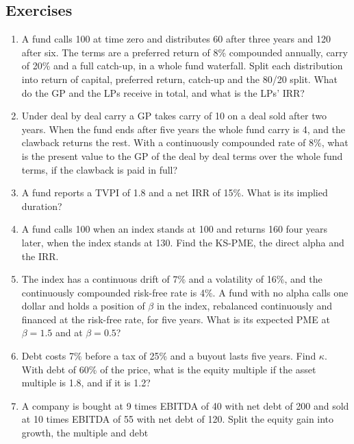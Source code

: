 \begin{chapterrefs}
\FloatBarrier
\section{Exercises}
\label{sec11:exercises}

\begin{enumerate}[label=\textbf{11.\arabic*}, ref=11.\arabic*, leftmargin=*]
  \item\label{exr11:one} A fund calls 100 at time zero and distributes 60 after three years and 120 after
  six. The terms are a preferred return of 8\% compounded annually, carry of 20\% and a full catch-up, in a
  whole fund waterfall. Split each distribution into return of capital, preferred return, catch-up and
  the 80/20 split. What do the GP and the LPs receive in total, and what is the LPs' IRR?
  \item\label{exr11:two} Under deal by deal carry a GP takes carry of 10 on a deal sold after two years.
  When the fund ends after five years the whole fund carry is 4, and the clawback returns the rest. With
  a continuously compounded rate of 8\%, what is the present value to the GP of the deal by deal terms
  over the whole fund terms, if the clawback is paid in full?
  \item\label{exr11:three} A fund reports a TVPI of 1.8 and a net IRR of 15\%. What is its implied
  duration?
  \item\label{exr11:four} A fund calls 100 when an index stands at 100 and returns 160 four years later,
  when the index stands at 130. Find the KS-PME, the direct alpha and the IRR.
  \item\label{exr11:five} The index has a continuous drift of 7\% and a volatility of 16\%, and the
  continuously compounded risk-free rate is 4\%. A fund with no alpha calls one dollar and holds a position of $\beta$ in the
  index, rebalanced continuously and financed at the risk-free rate, for five years. What is its
  expected PME at $\beta=1.5$ and at $\beta=0.5$?
  \item\label{exr11:six} Debt costs 7\% before a tax of 25\% and a buyout lasts five years. Find $\kappa$. With
  debt of 60\% of the price, what is the equity multiple if the asset multiple is 1.8, and if it is 1.2?
  \item\label{exr11:seven} A company is bought at 9 times EBITDA of 40 with net debt of 200 and sold at 10
  times EBITDA of 55 with net debt of 120. Split the equity gain into growth, the multiple and debt

\end{enumerate}
\end{chapterrefs}
